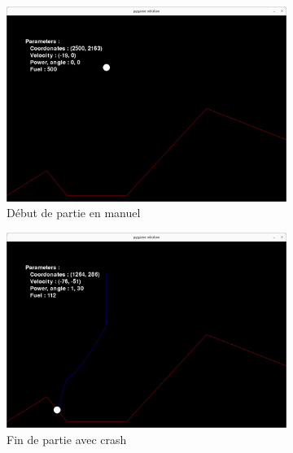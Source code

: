 \documentclass[french,a4paper,10pt,twocolumn]{article}
\begin{document}
\begin{figure}[H]
    \centering
    \begin{subfigure}[b]{0.3\textwidth}
        \centering
        \includegraphics[width=\textwidth]{images/initial_lvl_one_manual.png}
        \caption{Début de partie en manuel}
    \end{subfigure}
    \hfill
    \begin{subfigure}[b]{0.3\textwidth}
        \centering
        \includegraphics[width=\textwidth]{images/unsuccessfull_lvl_one_manual.png}
        \caption{Fin de partie avec crash}
    \end{subfigure}
    \hfill
    \begin{subfigure}[b]{0.3\textwidth}
        \centering

\end{subfigure}
\end{figure}
\end{document}
